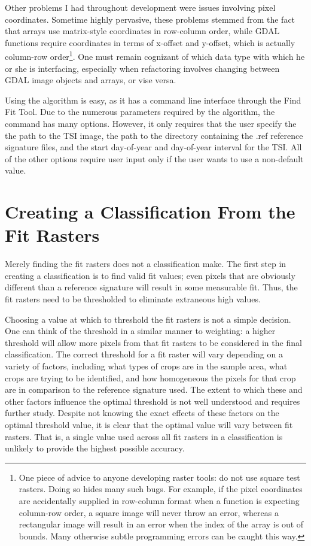 Other problems I had throughout development were issues involving pixel coordinates. Sometime highly pervasive, these problems stemmed from the fact that arrays use matrix-style coordinates in row-column order, while GDAL functions require coordinates in terms of x-offset and y-offset, which is actually column-row order\footnote{One piece of advice to anyone developing raster tools: do not use square test rasters. Doing so hides many such bugs. For example, if the pixel coordinates are accidentally supplied in row-column format when a function is expecting column-row order, a square image will never throw an error, whereas a rectangular image will result in an error when the index of the array is out of bounds. Many otherwise subtle programming errors can be caught this way.}. One must remain cognizant of which data type with which he or she is interfacing, especially when refactoring involves changing between GDAL image objects and arrays, or vise versa.

Using the algorithm is easy, as it has a command line interface through the Find Fit Tool. Due to the numerous parameters required by the algorithm, the command has many options. However, it only requires that the user specify the the path to the TSI image, the path to the directory containing the .ref reference signature files, and the start day-of-year and day-of-year interval for the TSI. All of the other options require user input only if the user wants to use a non-default value.

\section{Creating a Classification From the Fit Rasters}

Merely finding the fit rasters does not a classification make. The first step in creating a classification is to find valid fit values; even pixels that are obviously different than a reference signature will result in some measurable fit. Thus, the fit rasters need to be thresholded to eliminate extraneous high values.

Choosing a value at which to threshold the fit rasters is not a simple decision. One can think of the threshold in a similar manner to weighting:  a higher threshold will allow more pixels from that fit rasters to be considered in the final classification. The correct threshold for a fit raster will vary depending on a variety of factors, including what types of crops are in the sample area, what crops are trying to be identified, and how homogeneous the pixels for that crop are in comparison to the reference signature used. The extent to which these and other factors influence the optimal threshold is not well understood and requires further study. Despite not knowing the exact effects of these factors on the optimal threshold value, it is clear that the optimal value will vary between fit rasters. That is, a single value used across all fit rasters in a classification is unlikely to provide the highest possible accuracy.

